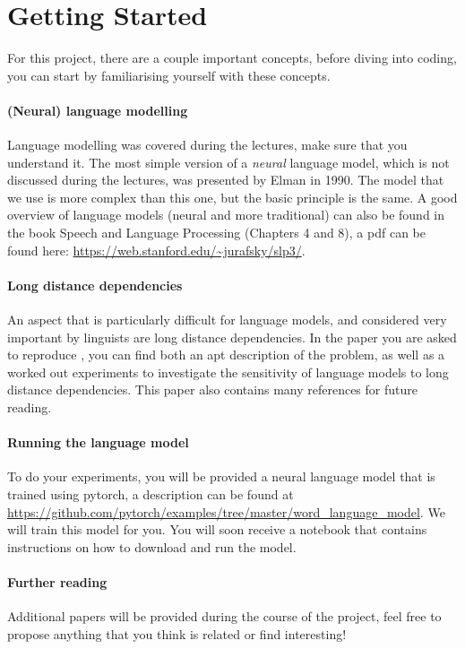 \documentclass{article}
\begin{document}
\section*{Getting Started}

For this project, there are a couple important concepts, before diving into coding, you can start by familiarising yourself with these concepts.

\paragraph{(Neural) language modelling}
Language modelling was covered during the lectures, make sure that you understand it.
The most simple version of a \textit{neural} language model, which is not discussed during the lectures, was presented by Elman in 1990.
The model that we use is more complex than this one, but the basic principle is the same.
A good overview of language models (neural and more traditional) can also be found in the book Speech and Language Processing (Chapters 4 and 8), a pdf can be found here: \url{https://web.stanford.edu/~jurafsky/slp3/}.

\paragraph{Long distance dependencies}
An aspect that is particularly difficult for language models, and considered very important by linguists are long distance dependencies.
In the paper you are asked to reproduce \citep{linzen2016assessing}, you can find both an apt description of the problem, as well as a worked out experiments to investigate the sensitivity of language models to long distance dependencies.
This paper also contains many references for future reading.

\paragraph{Running the language model}
To do your experiments, you will be provided a neural language model that is trained using pytorch, a description can be found at \url{https://github.com/pytorch/examples/tree/master/word_language_model}.
We will train this model for you.
You will soon receive a notebook that contains instructions on how to download and run the model.

\paragraph{Further reading}
Additional papers will be provided during the course of the project, feel free to propose anything that you think is related or find interesting!



\end{document}
